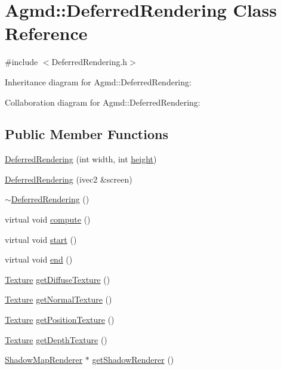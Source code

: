\hypertarget{class_agmd_1_1_deferred_rendering}{\section{Agmd\+:\+:Deferred\+Rendering Class Reference}
\label{class_agmd_1_1_deferred_rendering}
}


{\ttfamily \#include $<$Deferred\+Rendering.\+h$>$}



Inheritance diagram for Agmd\+:\+:Deferred\+Rendering\+:


Collaboration diagram for Agmd\+:\+:Deferred\+Rendering\+:
\subsection*{Public Member Functions}
\begin{DoxyCompactItemize}
\item 
\hyperlink{class_agmd_1_1_deferred_rendering_aa0340565cc8696ac71e70d630da629c3}{Deferred\+Rendering} (int width, int \hyperlink{_examples_2_bezier_2_app_8cpp_a48083b65ac9a863566dc3e3fff09a5b4}{height})
\item 
\hyperlink{class_agmd_1_1_deferred_rendering_a89f5f132a638725ae177a5c06d0f0d57}{Deferred\+Rendering} (ivec2 \&screen)
\item 
\hyperlink{class_agmd_1_1_deferred_rendering_aa7821dbe9add97724da5abe3754c2610}{$\sim$\+Deferred\+Rendering} ()
\item 
virtual void \hyperlink{class_agmd_1_1_deferred_rendering_a515c1e13b229417261fa43f77e594076}{compute} ()
\item 
virtual void \hyperlink{class_agmd_1_1_deferred_rendering_ac6aaad52470c21daebdb59855e201b34}{start} ()
\item 
virtual void \hyperlink{class_agmd_1_1_deferred_rendering_aaa09f668d35aea7fb30c940fd658f733}{end} ()
\item 
\hyperlink{class_agmd_1_1_texture}{Texture} \hyperlink{class_agmd_1_1_deferred_rendering_a58b92c863aec0b8167f91b7516d78a7e}{get\+Diffuse\+Texture} ()
\item 
\hyperlink{class_agmd_1_1_texture}{Texture} \hyperlink{class_agmd_1_1_deferred_rendering_a0aeb24cbe4df29cc7b7f6c96f453b5e7}{get\+Normal\+Texture} ()
\item 
\hyperlink{class_agmd_1_1_texture}{Texture} \hyperlink{class_agmd_1_1_deferred_rendering_ac745410438f12bc277f5098c912ca06f}{get\+Position\+Texture} ()
\item 
\hyperlink{class_agmd_1_1_texture}{Texture} \hyperlink{class_agmd_1_1_deferred_rendering_a6f06e52e67926947ae6c045f8e9ff2ac}{get\+Depth\+Texture} ()
\item 
\hyperlink{class_agmd_1_1_shadow_map_renderer}{Shadow\+Map\+Renderer} $\ast$ \hyperlink{class_agmd_1_1_deferred_rendering_a871cc35ee2e38a1865779fbc6889188b}{get\+Shadow\+Renderer} ()
\end{DoxyCompactItemize}
